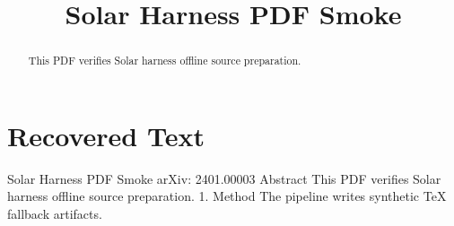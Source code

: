 \title{Solar Harness PDF Smoke}

\maketitle

\begin{abstract}
This PDF verifies Solar harness offline source preparation.
\end{abstract}

\section{Recovered Text}
Solar Harness PDF Smoke
arXiv: 2401.00003
Abstract
This PDF verifies Solar harness offline source preparation.
1. Method
The pipeline writes synthetic TeX fallback artifacts.

